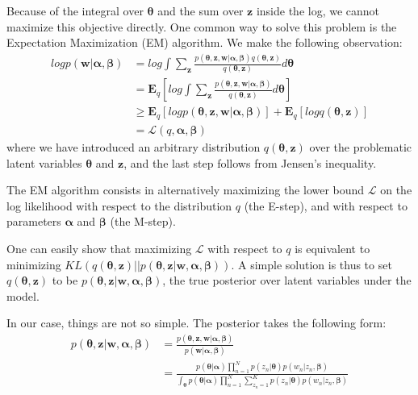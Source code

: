 \documentclass{article}
\begin{document}
Because of the integral over $\bm{\theta}$ and the sum over $\mathbf{z}$ inside the log, we cannot maximize this objective directly. One common way to solve this problem is the Expectation Maximization (EM) algorithm. We make the following observation:
\begin{align}
log p(\mathbf{w} | \bm{\alpha}, \bm{\beta}) 
&= log \int \sum_{\mathbf{z}} \frac{p (\bm{\theta}, \mathbf{z}, \mathbf{w} | \bm{\alpha}, \bm{\beta}) q(\bm{\theta}, \mathbf{z})}{q(\bm{\theta}, \mathbf{z})}  d\bm{\theta} \\
&= \mathbf{E}_q [log \int \sum_{\mathbf{z}} \frac{p (\bm{\theta}, \mathbf{z}, \mathbf{w} | \bm{\alpha}, \bm{\beta})}{q(\bm{\theta}, \mathbf{z})}  d\bm{\theta}] \\
&\geq \mathbf{E}_q [log p(\bm{\theta}, \mathbf{z}, \mathbf{w} | \bm{\alpha}, \bm{\beta})] + \mathbf{E}_q [log q(\bm{\theta}, \mathbf{z})] \\
&= \mathcal{L}(q, \bm{\alpha}, \bm{\beta})
\end{align}
where we have introduced an arbitrary distribution $q(\bm{\theta}, \mathbf{z})$ over the problematic latent variables $\bm{\theta}$ and $\mathbf{z}$, and the last step follows from Jensen's inequality.

The EM algorithm consists in alternatively maximizing the lower bound $\mathcal{L}$ on the log likelihood with respect to the distribution $q$ (the E-step), and with respect to parameters $\bm{\alpha}$ and $\bm{\beta}$ (the M-step).

One can easily show that maximizing $\mathcal{L}$ with respect to $q$ is equivalent to minimizing $KL(q(\bm{\theta}, \mathbf{z}) || p(\bm{\theta}, \mathbf{z} | \mathbf{w}, \bm{\alpha}, \bm{\beta}))$. A simple solution is thus to set $q(\bm{\theta}, \mathbf{z})$ to be $p(\bm{\theta}, \mathbf{z} | \mathbf{w}, \bm{\alpha}, \bm{\beta})$, the true posterior over latent variables under the model.

In our case, things are not so simple. The posterior takes the following form:
\begin{align}
p(\bm{\theta}, \mathbf{z} | \mathbf{w}, \bm{\alpha}, \bm{\beta}) &=
\frac{p(\bm{\theta}, \mathbf{z}, \mathbf{w} | \bm{\alpha}, \bm{\beta})}
		{p(\mathbf{w} | \bm{\alpha}, \bm{\beta})} \\
&= \frac{p(\bm{\theta} | \bm{\alpha}) \prod_{n=1}^N p(z_n | \bm{\theta})
	p(w_n | z_n, \bm{\beta})}
	{\int_{\bm{\theta}} p(\bm{\theta} | \bm{\alpha}) \prod_{n=1}^N 			\sum_{z_n=1}^K p(z_n | 	\bm{\theta}) p(w_n | z_n, \bm{\beta})}
\end{align}
\end{document}
